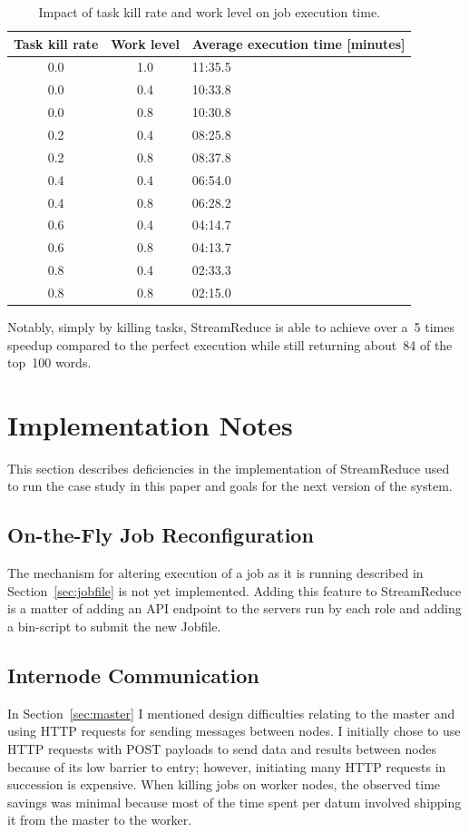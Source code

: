 \documentclass[12pt,twocolumn]{article}
\begin{document}
\begin{table}
\begin{tabularx}{\linewidth}{|c|c|X|}
\hline
Task kill rate & Work level & Average execution time [minutes] \\ \hline
0.0 & 1.0 & 11:35.5 \\ \hline
0.0 & 0.4 & 10:33.8 \\ \hline
0.0 & 0.8 & 10:30.8 \\ \hline
0.2 & 0.4 & 08:25.8 \\ \hline
0.2 & 0.8 & 08:37.8 \\ \hline
0.4 & 0.4 & 06:54.0 \\ \hline
0.4 & 0.8 & 06:28.2 \\ \hline
0.6 & 0.4 & 04:14.7 \\ \hline
0.6 & 0.8 & 04:13.7 \\ \hline
0.8 & 0.4 & 02:33.3 \\ \hline
0.8 & 0.8 & 02:15.0 \\ \hline
\end{tabularx}
\caption{Impact of task kill rate and work level on job execution time.}
\label{table:runtime}
\end{table}

Notably, simply by killing tasks, StreamReduce is able to achieve over a~5 times speedup compared
to the perfect execution while still returning about~84 of the top~100 words.

\section{Implementation Notes}
\label{sec:discussion}
This section describes deficiencies in the implementation of StreamReduce used to run the case study
in this paper and goals for the next version of the system.

\subsection{On-the-Fly Job Reconfiguration}
The mechanism for altering execution of a job as it is running described in Section~\ref{sec:jobfile}
is not yet implemented. Adding this feature to StreamReduce is a matter of adding an API endpoint
to the servers run by each role and adding a bin-script to submit the new Jobfile.

\subsection{Internode Communication}
In Section~\ref{sec:master} I mentioned design difficulties relating to the master and using HTTP
requests for sending messages between nodes. I initially chose to use HTTP requests with POST payloads
to send data and results between nodes because of its low barrier to entry; however, initiating many
HTTP requests in succession is expensive. When killing jobs on worker nodes, the observed time savings
was minimal because most of the time spent per datum involved shipping it from the master to the worker.
\end{document}
